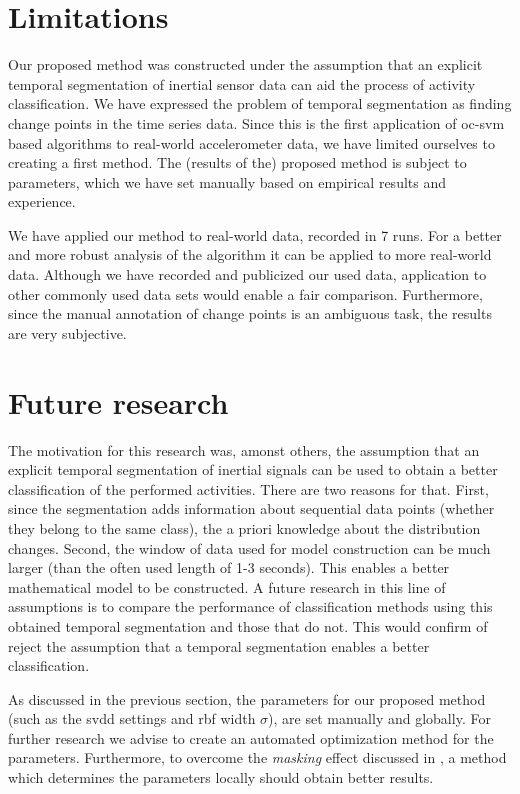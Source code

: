 
\section{Limitations}\label{sec:limitations}
Our proposed method was constructed under the assumption that an explicit temporal segmentation of inertial sensor data can aid the process of activity classification.
We have expressed the problem of temporal segmentation as finding change points in the time series data.
Since this is the first application of \gls{oc-svm} based algorithms to real-world accelerometer data, we have limited ourselves to creating a first method.
The (results of the) proposed method is subject to parameters, which we have set manually based on empirical results and experience.

We have applied our method to real-world data, recorded in 7 runs.
For a better and more robust analysis of the algorithm it can be applied to more real-world data.
Although we have recorded and publicized our used data, application to other commonly used data sets would enable a fair comparison.
Furthermore, since the manual annotation of change points is an ambiguous task, the results are very subjective.

\section{Future research}\label{sec:further_research}
The motivation for this research was, amonst others, the assumption that an explicit temporal segmentation of inertial signals can be used to obtain a better classification of the performed activities.
There are two reasons for that.
First, since the segmentation adds information about sequential data points (whether they belong to the same class), the a priori knowledge about the distribution changes.
Second, the window of data used for model construction can be much larger (than the often used length of 1-3 seconds).
This enables a better mathematical model to be constructed.
A future research in this line of assumptions is to compare the performance of classification methods using this obtained temporal segmentation and those that do not.
This would confirm of reject the assumption that a temporal segmentation enables a better classification.

As discussed in the previous section, the parameters for our proposed method (such as the \gls{svdd} settings and \gls{rbf} width $\sigma$), are set manually and globally.
For further research we advise to create an automated optimization method for the parameters.
Furthermore, to overcome the \emph{masking} effect discussed in , a method which determines the parameters locally should obtain better results.

